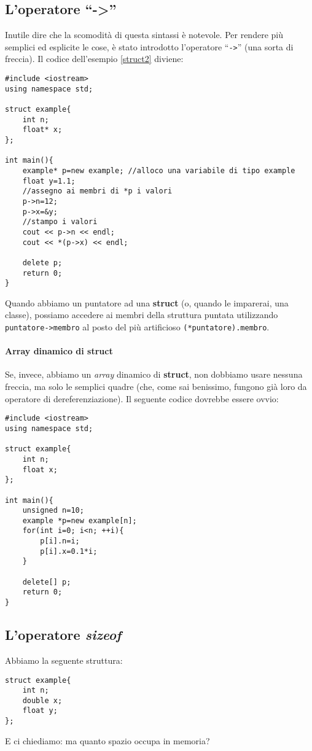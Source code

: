 \subsection{L'operatore ``->''}
Inutile dire che la scomodità di questa sintassi è notevole. Per rendere più semplici ed esplicite le cose, è stato introdotto l'operatore ``\verb|->|'' (una sorta di freccia). Il codice dell'esempio \ref{struct2} diviene:
\begin{lstlisting}
#include <iostream>
using namespace std;

struct example{
	int n;
	float* x;
};

int main(){
	example* p=new example; //alloco una variabile di tipo example
	float y=1.1;
	//assegno ai membri di *p i valori
	p->n=12;
	p->x=&y;
	//stampo i valori
	cout << p->n << endl;
	cout << *(p->x) << endl;

	delete p;
	return 0;
}
\end{lstlisting}

Quando abbiamo un puntatore ad una \textbf{struct} (o, quando le imparerai, una classe), possiamo accedere ai membri della struttura puntata utilizzando \verb|puntatore->membro| al posto del più artificioso \verb|(*puntatore).membro|.
\paragraph{Array dinamico di struct}
Se, invece, abbiamo un \emph{array} dinamico di \textbf{struct}, non dobbiamo usare nessuna freccia, ma solo le semplici quadre (che, come sai benissimo, fungono già loro da operatore di dereferenziazione). Il seguente codice dovrebbe essere ovvio:

\begin{lstlisting}
#include <iostream>
using namespace std;

struct example{
	int n;
	float x;
};

int main(){
	unsigned n=10;
	example *p=new example[n];
	for(int i=0; i<n; ++i){
		p[i].n=i;
		p[i].x=0.1*i;
	}
	
	delete[] p;
	return 0;
}
\end{lstlisting}

\subsection{L'operatore \emph{sizeof}} %
Abbiamo la seguente struttura:
\begin{lstlisting}
struct example{
	int n;
	double x;
	float y;
};
\end{lstlisting}
E ci chiediamo: ma quanto spazio occupa in memoria?

